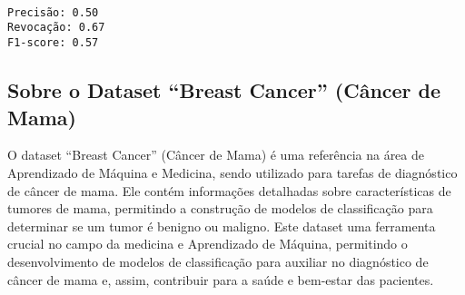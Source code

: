 \documentclass[11pt]{article}
\begin{document}
    \begin{center}
    \end{center}
    { \hspace*{\fill} \\}
    
    \begin{center}
    \end{center}
    { \hspace*{\fill} \\}
    
    \begin{center}
    \end{center}
    { \hspace*{\fill} \\}
    
    \begin{Verbatim}[commandchars=\\\{\}]
Precisão: 0.50
Revocação: 0.67
F1-score: 0.57
    \end{Verbatim}

    \hypertarget{sobre-o-dataset-breast-cancer-cuxe2ncer-de-mama}{%
\subsection{Sobre o Dataset ``Breast Cancer'' (Câncer de
Mama)}\label{sobre-o-dataset-breast-cancer-cuxe2ncer-de-mama}}

O dataset ``Breast Cancer'' (Câncer de Mama) é uma referência na área de
Aprendizado de Máquina e Medicina, sendo utilizado para tarefas de
diagnóstico de câncer de mama. Ele contém informações detalhadas sobre
características de tumores de mama, permitindo a construção de modelos
de classificação para determinar se um tumor é benigno ou maligno. Este
dataset uma ferramenta crucial no campo da medicina e Aprendizado de
Máquina, permitindo o desenvolvimento de modelos de classificação para
auxiliar no diagnóstico de câncer de mama e, assim, contribuir para a
saúde e bem-estar das pacientes.
\end{document}
